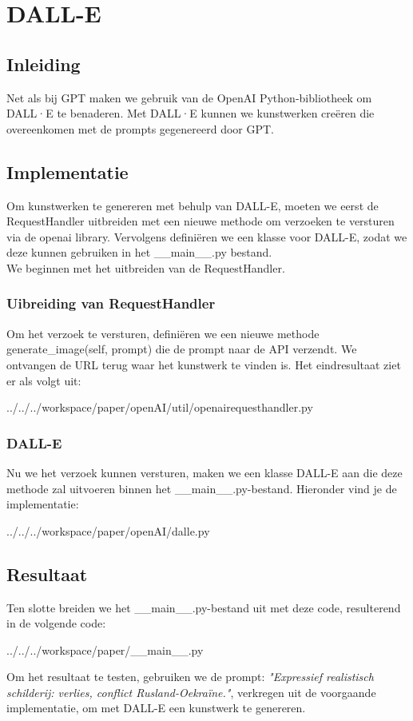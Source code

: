 \section{DALL-E}

\subsection{Inleiding}
Net als bij GPT maken we gebruik van de OpenAI Python-bibliotheek om DALL·E te benaderen. Met DALL·E kunnen we kunstwerken creëren die overeenkomen met de prompts gegenereerd door GPT.

\subsection{Implementatie}
Om kunstwerken te genereren met behulp van DALL-E, moeten we eerst de RequestHandler uitbreiden met een nieuwe methode om verzoeken te versturen via de openai library. Vervolgens definiëren we een klasse voor DALL-E, zodat we deze kunnen gebruiken in het 
\_\_main\_\_.py bestand. \\

We beginnen met het uitbreiden van de RequestHandler.

\subsubsection{Uibreiding van RequestHandler}
Om het verzoek te versturen, definiëren we een nieuwe methode generate\_image(self, prompt) die de prompt naar de API verzendt. We ontvangen de URL terug waar het kunstwerk te vinden is. Het eindresultaat ziet er als volgt uit:
\begin{pythoncode}{../../../workspace/paper/openAI/util/openairequesthandler.py}
\end{pythoncode}

\subsubsection{DALL-E}
Nu we het verzoek kunnen versturen, maken we een klasse DALL-E aan die deze methode zal uitvoeren binnen het  \_\_main\_\_.py-bestand. Hieronder vind je de implementatie:
\begin{pythoncode}{../../../workspace/paper/openAI/dalle.py}
\end{pythoncode}
    
\subsection{Resultaat}
Ten slotte breiden we het \_\_main\_\_.py-bestand uit met deze code, resulterend in de volgende code:
\begin{pythoncode}{../../../workspace/paper/__main__.py}
\end{pythoncode}
Om het resultaat te testen, gebruiken we de prompt: \emph{"Expressief realistisch schilderij: verlies, conflict Rusland-Oekraïne."}, verkregen uit de voorgaande implementatie, om met DALL-E een kunstwerk te genereren. \\

